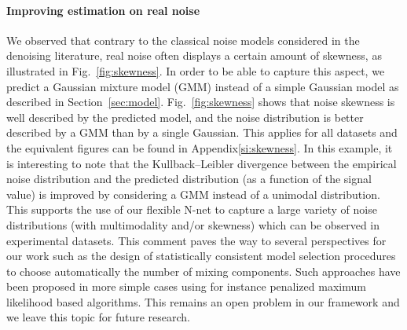 \documentclass[lettersize,journal]{IEEEtran}
\begin{document}
\paragraph{Improving estimation on real noise}
\label{sec:exp:real:noise}
We observed that contrary to the classical noise models considered in the denoising literature, real noise often displays a certain amount of skewness, as illustrated in Fig.~\ref{fig:skewness}.
In order to be able to capture this aspect, we predict a Gaussian mixture model (GMM) instead of a simple Gaussian model as described in Section~\ref{sec:model}. Fig.~\ref{fig:skewness} shows that noise skewness is well described by the predicted model, and the noise distribution is better described by a GMM than by a single Gaussian.
This applies for all datasets and the equivalent figures can be found in Appendix\ref{si:skewness}.
In this example, it is interesting to note that the Kullback–Leibler divergence between the empirical noise distribution and the predicted distribution (as a function of the signal value) is improved by considering a GMM instead of a unimodal distribution.
This supports the use of our flexible N-net to capture a large variety of noise distributions (with multimodality and/or skewness) which can be observed in experimental datasets.
This comment paves the way to several perspectives for our work such as the design of statistically consistent model selection procedures to choose automatically the number of mixing components.
Such approaches have been proposed in more simple cases using for instance penalized maximum likelihood based algorithms.
This remains an open problem in our framework and we leave this topic for future research.
\end{document}
